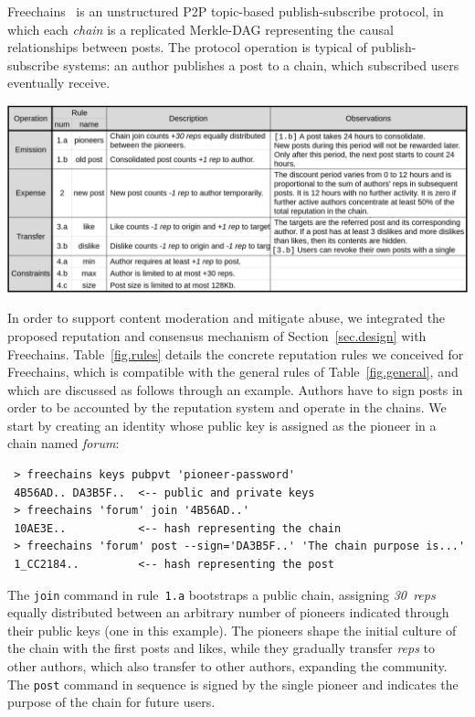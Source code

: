 \documentclass[12pt]{article}
\newcommand{\FC}       {Freechains\xspace}
\newcommand{\reps}     {\emph{reps}\xspace}
\newcommand{\nreps}[1] {\emph{#1~reps\xspace}}
\newcommand{\code}[1]  {\texttt{\footnotesize{#1}}}
\begin{document}
\FC~\cite{fcs.sbseg20} is an unstructured P2P topic-based publish-subscribe
protocol, in which each \emph{chain} is a replicated Merkle-DAG representing
the causal relationships between posts.
%
The protocol operation is typical of publish-subscribe systems: an author
publishes a post to a chain, which subscribed users eventually receive.

\begin{table}
\centering
\includegraphics[width=\textwidth]{rules.png}
\caption{
    Reputation rules for public forum chains in \FC.
    The chosen constants ($30~reps$, $24h$, etc) are arbitrary and target
    typical Internet forums.
}
\label{fig.rules}
\end{table}

In order to support content moderation and mitigate abuse, we integrated the
proposed reputation and consensus mechanism of Section~\ref{sec.design} with
\FC.
Table~\ref{fig.rules} details the concrete reputation rules we conceived for
\FC, which is compatible with the general rules of Table~\ref{fig.general}, and
which are discussed as follows through an example.
Authors have to sign posts in order to be accounted by the reputation system
and operate in the chains.
We start by creating an identity whose public key is assigned as the pioneer in
a chain named \emph{forum}:

{\footnotesize
\begin{verbatim}
 > freechains keys pubpvt 'pioneer-password'
 4B56AD.. DA3B5F..  <-- public and private keys
 > freechains 'forum' join '4B56AD..'
 10AE3E..           <-- hash representing the chain
 > freechains 'forum' post --sign='DA3B5F..' 'The chain purpose is...'
 1_CC2184..         <-- hash representing the post
\end{verbatim}
}

The \code{join} command in rule~\code{1.a} bootstraps a public chain,
assigning \nreps{30} equally distributed between an arbitrary number of
pioneers indicated through their public keys (one in this example).
The pioneers shape the initial culture of the chain with the first posts and
likes, while they gradually transfer \reps to other authors, which also
transfer to other authors, expanding the community.
%
The \code{post} command in sequence is signed by the single pioneer and
indicates the purpose of the chain for future users.
\end{document}
